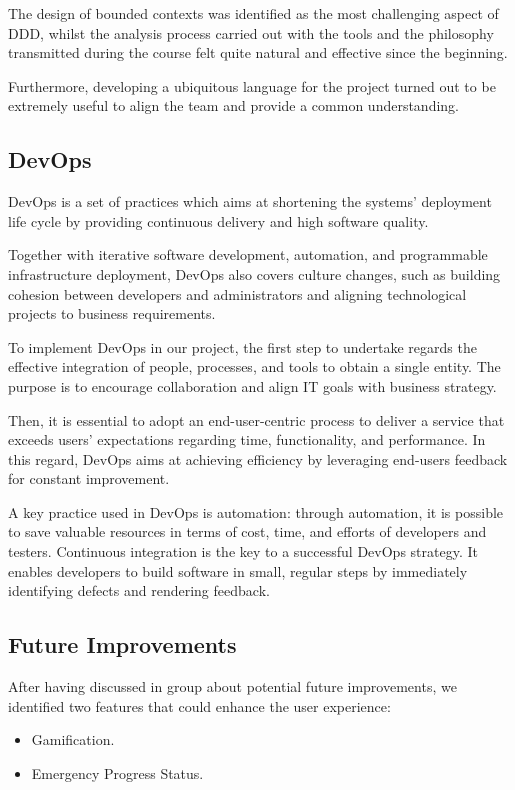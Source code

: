 \documentclass[11pt,a4paper]{article}
\begin{document}
The design of bounded contexts was identified as the most challenging aspect of DDD, whilst the analysis process carried out with the tools and the philosophy transmitted during the course felt quite natural and effective since the beginning.

Furthermore, developing a ubiquitous language for the project turned out to be extremely useful to align the team and provide a common understanding.

\subsection{DevOps}
DevOps is a set of practices which aims at shortening the systems' deployment life cycle by providing continuous delivery and high software quality.

Together with iterative software development, automation, and programmable infrastructure deployment, DevOps also covers culture changes, such as building cohesion between developers and administrators and aligning technological projects to business requirements.

To implement DevOps in our project, the first step to undertake regards the effective integration of people, processes, and tools to obtain a single entity.
%
The purpose is to encourage collaboration and align IT goals with business strategy.

Then, it is essential to adopt an end-user-centric  process to deliver a service that exceeds users' expectations regarding time, functionality, and performance.
%
In this regard, DevOps aims at achieving efficiency by leveraging end-users feedback for constant improvement.

A key practice used in DevOps is automation: through automation, it is possible to save valuable resources in terms of cost, time, and efforts of developers and testers.
%
Continuous integration is the key to a successful DevOps strategy.
%
It enables developers to build software in small, regular steps by immediately identifying defects and rendering feedback.

\subsection{Future Improvements}
After having discussed in group about potential future improvements, we identified two features that could enhance the user experience:

\begin{itemize}
    \item Gamification.
    \item Emergency Progress Status.
\end{itemize}
\end{document}
